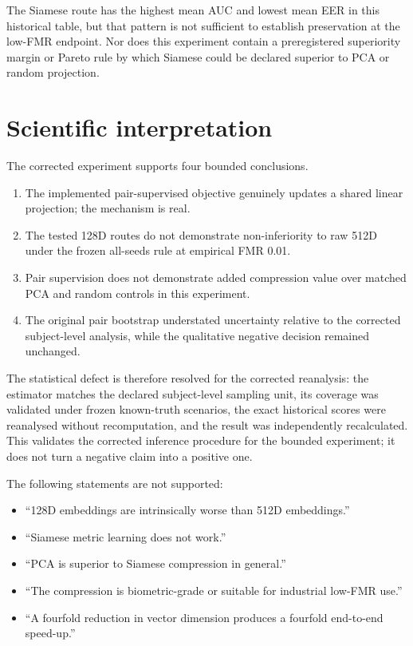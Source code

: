 \documentclass[10pt,a4paper]{article}
\begin{document}
The Siamese route has the highest mean AUC and lowest mean EER in this historical table, but
that pattern is not sufficient to establish preservation at the low-FMR endpoint. Nor does
this experiment contain a preregistered superiority margin or Pareto rule by which Siamese
could be declared superior to PCA or random projection.

\section{Scientific interpretation}\label{sec:interpretation}

The corrected experiment supports four bounded conclusions.

\begin{enumerate}
\item The implemented pair-supervised objective genuinely updates a shared linear
      projection; the mechanism is real.
\item The tested 128D routes do not demonstrate non-inferiority to raw 512D under the frozen
      all-seeds rule at empirical FMR 0.01.
\item Pair supervision does not demonstrate added compression value over matched PCA and
      random controls in this experiment.
\item The original pair bootstrap understated uncertainty relative to the corrected
      subject-level analysis, while the qualitative negative decision remained unchanged.
\end{enumerate}

The statistical defect is therefore resolved for the corrected reanalysis: the estimator
matches the declared subject-level sampling unit, its coverage was validated under frozen
known-truth scenarios, the exact historical scores were reanalysed without recomputation,
and the result was independently recalculated. This validates the corrected inference
procedure for the bounded experiment; it does not turn a negative claim into a positive one.

The following statements are not supported:
\begin{itemize}
\item ``128D embeddings are intrinsically worse than 512D embeddings.''
\item ``Siamese metric learning does not work.''
\item ``PCA is superior to Siamese compression in general.''
\item ``The compression is biometric-grade or suitable for industrial low-FMR use.''
\item ``A fourfold reduction in vector dimension produces a fourfold end-to-end speed-up.''
\end{itemize}
\end{document}
